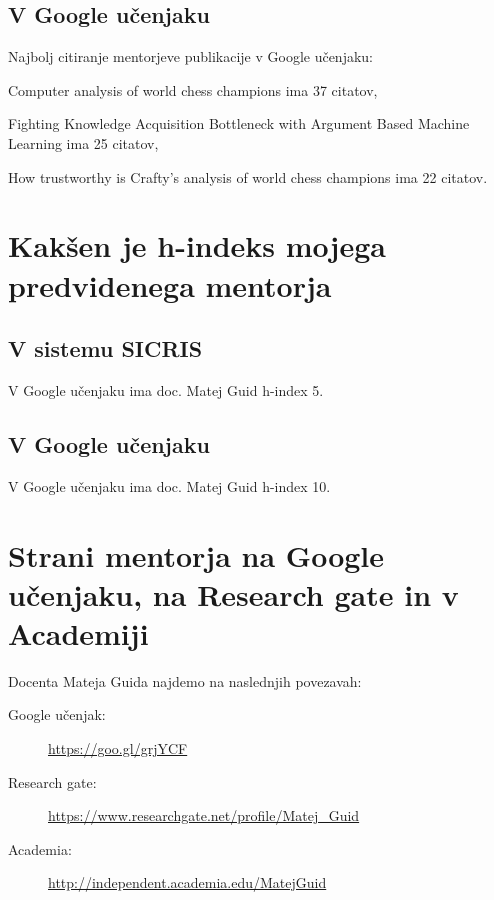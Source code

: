 \documentclass[11pt,a4paper]{article}
\begin{document}
\subsection{V Google učenjaku}
Najbolj citiranje mentorjeve publikacije v Google učenjaku:
\begin{description}
	\item Computer analysis of world chess champions ima 37 citatov,
	\item Fighting Knowledge Acquisition Bottleneck with Argument Based Machine Learning ima 25 citatov,
	\item How trustworthy is Crafty’s analysis of world chess champions ima 22 citatov.
\end{description}

\section{Kakšen je h-indeks mojega predvidenega mentorja}

\subsection{V sistemu SICRIS}
V Google učenjaku ima doc. Matej Guid h-index 5.
\subsection{V Google učenjaku}
V Google učenjaku ima doc. Matej Guid h-index 10.

\section{Strani mentorja na Google učenjaku, na Research gate in v  Academiji}
Docenta Mateja Guida najdemo na naslednjih povezavah:
\begin{description}
\item[Google učenjak:] \url{https://goo.gl/grjYCF}
\item[Research gate:] \url{https://www.researchgate.net/profile/Matej_Guid}
\item[Academia:] \url{http://independent.academia.edu/MatejGuid}

\end{description}



\end{document}
